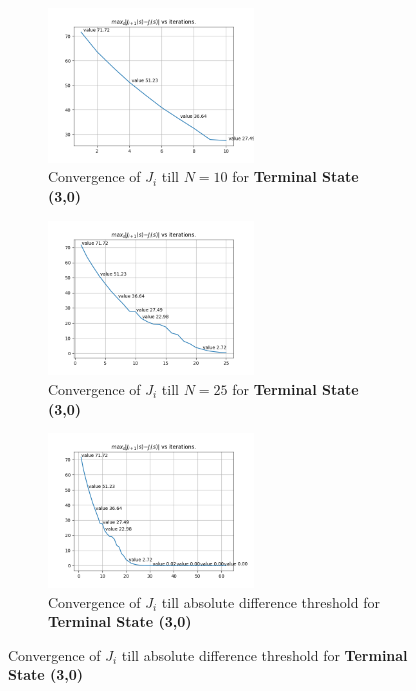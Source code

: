 \begin{figure}[h]
\begin{subfigure}
\centering
\includegraphics[angle=0,width=0.6\textwidth]{hw2/logs/t=3_N=10/convergence-till-10.png}
\caption{Convergence of $J_i$ till $N=10$ for \textbf{Terminal State (3,0)}}
\end{subfigure}

\begin{subfigure}
\centering
\includegraphics[angle=0,width=0.6\textwidth]{hw2/logs/t=3_N=25/convergence-till-25.png}
\caption{Convergence of $J_i$ till $N=25$ for \textbf{Terminal State (3,0)}}
\end{subfigure}

\begin{subfigure}
\centering
\includegraphics[angle=0,width=0.6\textwidth]{hw2/logs/t=3_N=-1/convergence-till-62.png}
\caption{Convergence of $J_i$ till absolute difference threshold for \textbf{Terminal State (3,0)}}
\end{subfigure}
\end{figure}

